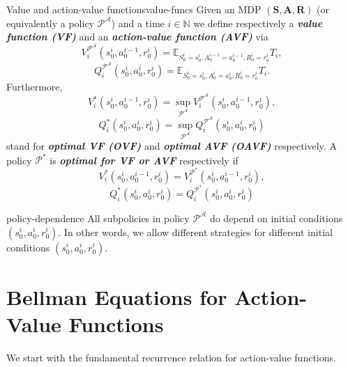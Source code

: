 \documentclass[a4paper, 11pt]{article}
\numberwithin{equation}{section}
\theoremstyle{plain}
\theoremstyle{definition}
\newcommand{\E}{{\mathbb E}}
\newcommand{\1}{{\mathbbm 1}}
\newcommand{\mb}[1]{\mathbf{#1}}
\newcommand{\mc}[1]{\mathcal{#1}}
\newcommand{\bi}[1]{\textbf{\textit{#1}}}
\newcommand{\N}{{\mathbb{N}}}
\begin{document}
	\begin{fdefi}{Value and action-value functions}{value-funcs}
		Given an MDP $(\mb{S}, \mb{A}, \mb{R})$ (or equivalently a policy $\mc{P}^\mc{A}$) and a time $i \in \N$ we define respectively a \bi{value function (VF)} and an \bi{action-value function (AVF)} via
		\begin{equation*}
			V_{i}^{\mc{P}^\mc{A}}(s_0^{i}, a_0^{i - 1}, r_0^{i}) = \E_{S_0^{i} = s_0^{i }, A_0^{i - 1} = a_0^{i - 1}, R_0^{i } = r_0^{i}} T_i,
		\end{equation*}
		\begin{equation*}
			Q^{\mc{P}^\mc{A}}_i(s_0^{i}, a_0^{i}, r_0^{i }) = \E_{S_0^{i } = s_0^{i }, A_0^{i} = a_0^{i}, R_0^{i } = r_0^{i }} T_i.
		\end{equation*}
		Furthermore, 
		\begin{equation}\label{optimal}
			V_i^*(s_0^{i}, a_0^{i - 1}, r_0^{i}) = \sup_{\mc{P}^\mc{A}} V_i^{\mc{P}^\mc{A}}(s_0^{i}, a_0^{i - 1}, r_0^{i}),
		\end{equation}
		\begin{equation*}
			Q_i^*(s_0^{i}, a_0^{i}, r_0^{i}) = \sup_{\mc{P}^\mc{A}} Q_i^{\mc{P}^\mc{A}}(s_0^{i}, a_0^{i}, r_0^{i})
		\end{equation*}	
		stand for \bi{optimal VF (OVF)} and \bi{optimal AVF (OAVF)} respectively. A policy $\mc{P}^*$ is \bi{optimal for VF or AVF} respectively if
		\begin{equation}
			V_i^*(s_0^{i}, a_0^{i - 1}, r_0^{i}) =  V_i^{\mc{P}^*}(s_0^{i}, a_0^{i - 1}, r_0^{i}),
		\end{equation}
		\begin{equation*}
			Q_i^*(s_0^{i}, a_0^{i}, r_0^{i}) =  Q_i^{\mc{P}^*}(s_0^{i}, a_0^{i}, r_0^{i})
		\end{equation*}
	\end{fdefi}
	
	\begin{frema}{}{policy-dependence}
		All subpolicies in policy $\mc{P}^\mc{A}$ do depend on initial conditions $(s_0^{i}, a_0^{i}, r_0^{i})$. In other words, we allow different strategies for different initial conditions $(s_0^{i}, a_0^{i}, r_0^{i})$.
	\end{frema}
	
	\section{Bellman Equations for Action-Value Functions}
	
	We start with the fundamental recurrence relation for action-value functions.
	
\end{document}
